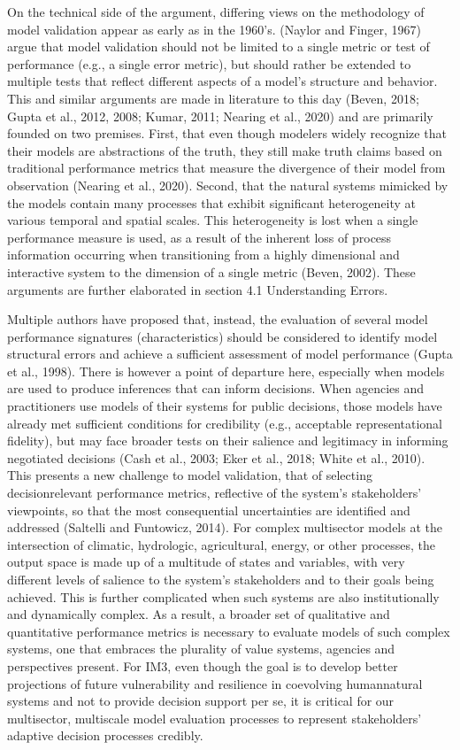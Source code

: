 \documentclass[letterpaper,10pt,english]{sphinxmanual}
\begin{document}
\sphinxAtStartPar
On the technical side of the argument, differing views on the methodology of model validation appear as early as in the 1960’s. (Naylor and Finger, 1967) argue that model validation should not be limited to a single metric or test of performance (e.g., a single error metric), but should rather be extended to multiple tests that reflect different aspects of a model’s structure and behavior. This and similar arguments are made in literature to this day (Beven, 2018; Gupta et al., 2012, 2008; Kumar, 2011; Nearing et al., 2020) and are primarily founded on two premises. First, that even though modelers widely recognize that their models are abstractions of the truth, they still make truth claims based on traditional performance metrics that measure the divergence of their model from observation (Nearing et al., 2020). Second, that the natural systems mimicked by the models contain many processes that exhibit significant heterogeneity at various temporal and spatial scales. This heterogeneity is lost when a single performance measure is used, as a result of the inherent loss of process information occurring when transitioning from a highly dimensional and interactive system to the dimension of a single metric (Beven, 2002). These arguments are further elaborated in section 4.1 Understanding Errors.

\sphinxAtStartPar
Multiple authors have proposed that, instead, the evaluation of several model performance signatures (characteristics) should be considered to identify model structural errors and achieve a sufficient assessment of model performance (Gupta et al., 1998). There is however a point of departure here, especially when models are used to produce inferences that can inform decisions. When agencies and practitioners use models of their systems for public decisions, those models have already met sufficient conditions for credibility (e.g., acceptable representational fidelity), but may face broader tests on their salience and legitimacy in informing negotiated decisions (Cash et al., 2003; Eker et al., 2018; White et al., 2010). This presents a new challenge to model validation, that of selecting decision\sphinxhyphen{}relevant performance metrics, reflective of the system’s stakeholders’ viewpoints, so that the most consequential uncertainties are identified and addressed (Saltelli and Funtowicz, 2014). For complex multisector models at the intersection of climatic, hydrologic, agricultural, energy, or other processes, the output space is made up of a multitude of states and variables, with very different levels of salience to the system’s stakeholders and to their goals being achieved. This is further complicated when such systems are also institutionally and dynamically complex. As a result, a broader set of qualitative and quantitative performance metrics is necessary to evaluate models of such complex systems, one that embraces the plurality of value systems, agencies and perspectives present. For IM3, even though the goal is to develop better projections of future vulnerability and resilience in co\sphinxhyphen{}evolving human\sphinxhyphen{}natural systems and not to provide decision support per se, it is critical for our multisector, multiscale model evaluation processes to represent stakeholders’ adaptive decision processes credibly.
\end{document}

